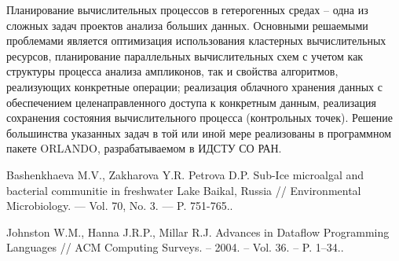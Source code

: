 \documentclass[12pt]{llncs}  %
\begin{document}
Планирование вычислительных процессов в гетерогенных средах -- одна из сложных задач проектов анализа больших данных.  Основными решаемыми проблемами является оптимизация использования кластерных вычислительных ресурсов, планирование параллельных вычислительных схем с учетом как структуры процесса анализа ампликонов, так и свойства алгоритмов, реализующих конкретные операции; реализация облачного хранения данных с обеспечением целенаправленного доступа к конкретным данным, реализация сохранения состояния вычислительного процесса (контрольных точек).  Решение большинства указанных задач в той или иной мере реализованы в программном пакете ORLANDO, разрабатываемом в ИДСТУ СО РАН.






%

%

\begin{thebibliography}{9} %
 Bashenkhaeva M.V., Zakharova Y.R. Petrova D.P. Sub-Ice microalgal and bacterial communitie in freshwater Lake Baikal, Russia // Environmental Microbiology. — Vol. 70, No. 3. — P. 751-765..

 Johnston W.M., Hanna J.R.P., Millar R.J. Advances in Dataflow Programming Languages // ACM Computing Surveys. – 2004. – Vol. 36. – P. 1–34..



\end{thebibliography}
\end{document}
